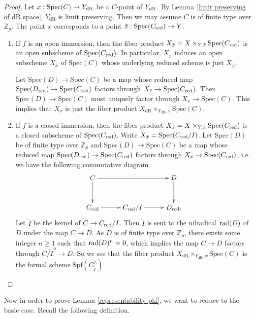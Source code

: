 \documentclass[10pt]{article}
\numberwithin{equation}{section}
\newcommand{\bZ}{{\mathbb Z}}
\newcommand{\Spf}{{\mathrm{Spf}}}           %
\newcommand{\Spec}{{\mathrm{Spec}}}         %
\newcommand{\dR}{{\mathrm{dR}}}             %
\begin{document}
\begin{proof}
Let $x:\Spec(C)\to Y_{\rm dR}$ be a $C$-point of $Y_{\rm dR}$. By Lemma \ref{limit preserving of dR space}, $Y_{\dR}$ is limit preserving. Then we may assume $C$ is of finite type over $\bZ_p$. The point $x$ corresponds to a point $\tilde x:\Spec(C_{\rm red})\to Y$. 
    \begin{enumerate}
        \item  If $f$ is an open immersion, then the fiber product $X_{\tilde x}=X\times_{Y,\tilde x}\Spec(C_{\rm red})$ is an open subscheme of $\Spec(C_{\rm red})$. In particular, $X_{\tilde x}$ induces an open subscheme $X_{x}$ of $\Spec(C)$ whose underlying reduced scheme is just $X_{\tilde x}$. 

        Let $\Spec(D)\to \Spec(C)$ be a map whose reduced map $\Spec(D_{\rm red})\to \Spec(C_{\rm red})$ factors through $X_{\tilde x}\to \Spec(C_{\rm red})$. Then $\Spec(D)\to \Spec(C)$ must uniquely factor through $X_{x}\to \Spec(C)$. This implies that $X_{ x}$ is just the fiber product $X_{\dR}\times_{Y_{\dR},x}\Spec(C)$.

        \item If $f$ is a closed immersion, then the fiber product $X_{\tilde x}=X\times_{Y,\tilde x}\Spec(C_{\rm red})$ is a closed subscheme of $\Spec(C_{\rm red})$. Write $X_{\tilde x}=\Spec(C_{\rm red}/I)$. Let $\Spec(D)$ be of finite type over $\bZ_p$ and $\Spec(D)\to \Spec(C)$ be a map whose reduced map $\Spec(D_{\rm red})\to \Spec(C_{\rm red})$ factors through $X_{\tilde x}\to \Spec(C_{\rm red})$, i.e. we have the following commutative diagram
        \begin{equation}
            \xymatrix@=1cm{
            C\ar[d]\ar[rr] &  & D\ar[d]\\
            C_{\rm red}\ar[r] & C_{\rm red}/I\ar[r] & D_{\rm red}.
            }
        \end{equation}
Let $\tilde I$ be the kernel of $C\to C_{\rm red}/I$. Then $\tilde I$ is sent to the nilradical ${\rm rad}(D)$ of $D$ under the map $C\to D$. As $D$ is of finite type over $\bZ_p$, there exists some integer $n\geq 1$ such that ${\rm rad}(D)^n=0$, which implies the map $C\to D$ factors through $C/{\tilde I}^n\to D$. So we see that the fiber product $X_{\dR}\times_{Y_{\dR},x}\Spec(C)$ is the formal scheme $\Spf(C^{\wedge}_{\tilde I})$.
    \end{enumerate}
\end{proof}


Now in order to prove Lemma \ref{representability-phi}, we want to reduce to the basic case. Recall the following definition.
\end{document}

